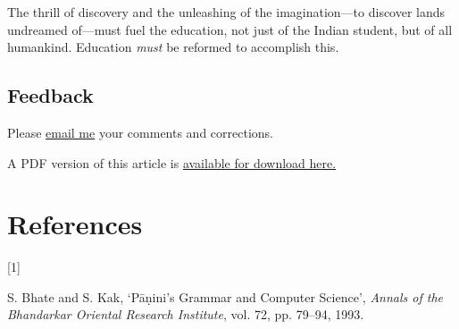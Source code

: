 \documentclass[
  12pt,
  british,
  a4paper,
  rgb,
  dvipsnames,
  svgnames,
  hyphens]{article}
\newlength{\cslhangindent}
\newlength{\csllabelwidth}
\newenvironment{CSLReferences}[2] %
 {%
  \setlength{\parindent}{0pt}
  \ifodd #1 \everypar{\setlength{\hangindent}{\cslhangindent}}\ignorespaces\fi
  \ifnum #2 > 0
  \setlength{\parskip}{#2\baselineskip}
  \fi
 }%
 {}
\newcommand{\CSLLeftMargin}[1]{\parbox[t]{\csllabelwidth}{#1}}
\newcommand{\CSLRightInline}[1]{\parbox[t]{\linewidth - \csllabelwidth}{#1}\break}
\begin{document}
The thrill of discovery and the unleashing of the imagination---to
discover lands undreamed of---must fuel the education, not just of the
Indian student, but of all humankind. Education \emph{must} be reformed
to accomplish this.

\hypertarget{feedback}{%
\subsection{Feedback}\label{feedback}}

Please \href{mailto:feedback.swanlotus@gmail.com}{email me} your
comments and corrections.

\noindent A PDF version of this article is
\href{./what-ails-indian-education.pdf}{available for download here.}

\hypertarget{bibliography}{%
\section*{References}\label{bibliography}}

\hypertarget{refs}{}
\begin{CSLReferences}{0}{0}
\leavevmode{}%
\CSLLeftMargin{{[}1{]} }
\CSLRightInline{S. Bhate and S. Kak, {`{Pāṇini's Grammar and Computer
Science}'}, \emph{Annals of the Bhandarkar Oriental Research Institute},
vol. 72, pp. 79--94, 1993. }

\end{CSLReferences}
\end{document}
